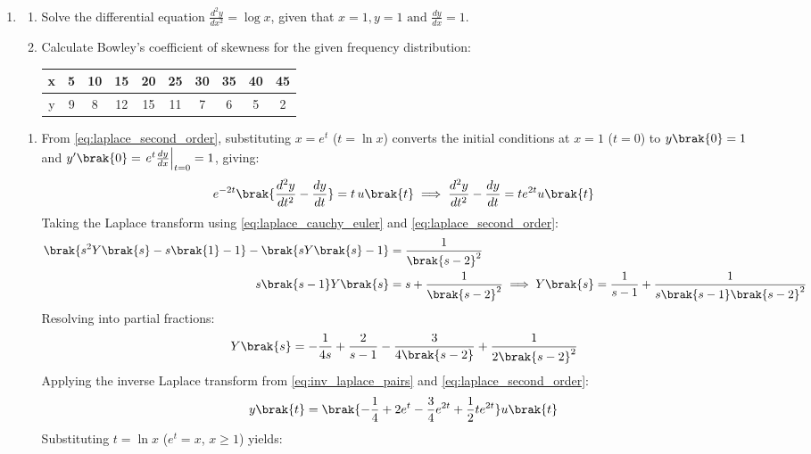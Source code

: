 \begin{enumerate}[label=\thesubsection.\arabic*, ref=\thesubsection.\theenumi]
	\item \hfill {}
	\begin{enumerate}[label=\brak{\alph*}]
		\item Solve the differential equation $\frac{d^2y}{dx^2} = \log x$, given that $x=1, y=1 \text{ and } \frac{dy}{dx} = 1$.
		\item Calculate Bowley's coefficient of skewness for the given frequency distribution:
		\begin{center}
			\begin{tabular}{|c|c|c|c|c|c|c|c|c|c|}
				\hline
				x & 5 & 10 & 15 & 20 & 25 & 30 & 35 & 40 & 45 \\ \hline
				y & 9 & 8 & 12 & 15 & 11 & 7 & 6 & 5 & 2 \\ \hline
			\end{tabular}
		\end{center}
	\end{enumerate}
	\solution
	\begin{enumerate}[label=\brak{\alph*}]
		\item From \eqref{eq:laplace_second_order}, substituting $x = e^t$ ($t = \ln x$) converts the initial conditions at $x = 1$ ($t = 0$) to $y\brak{0} = 1$ and $y'\brak{0} = \left.e^t\frac{dy}{dx}\right|_{t=0} = 1$, giving:
		\begin{align}
			e^{-2t}\brak{\frac{d^2y}{dt^2} - \frac{dy}{dt}} = t\,u\brak{t} \implies \frac{d^2y}{dt^2} - \frac{dy}{dt} = t e^{2t} u\brak{t}
		\end{align}
		Taking the Laplace transform using \eqref{eq:laplace_cauchy_euler} and \eqref{eq:laplace_second_order}:
		\begin{align}
			\brak{s^2 Y\brak{s} - s\brak{1} - 1} - \brak{s Y\brak{s} - 1} &= \frac{1}{\brak{s-2}^2} \\
			s\brak{s-1}Y\brak{s} &= s + \frac{1}{\brak{s-2}^2} \implies Y\brak{s} = \frac{1}{s-1} + \frac{1}{s\brak{s-1}\brak{s-2}^2}
		\end{align}
		Resolving into partial fractions:
		\begin{align}
			Y\brak{s} = -\frac{1}{4s} + \frac{2}{s-1} - \frac{3}{4\brak{s-2}} + \frac{1}{2\brak{s-2}^2}
		\end{align}
		Applying the inverse Laplace transform from \eqref{eq:inv_laplace_pairs} and \eqref{eq:laplace_second_order}:
		\begin{align}
			y\brak{t} = \brak{-\frac{1}{4} + 2e^t - \frac{3}{4}e^{2t} + \frac{1}{2}t e^{2t}}u\brak{t}
		\end{align}
		Substituting $t = \ln x$ ($e^t = x$, $x \ge 1$) yields:

\end{enumerate}
\end{enumerate}
